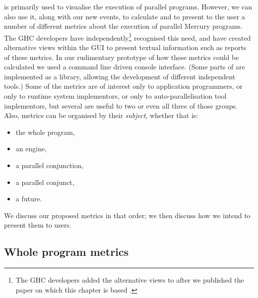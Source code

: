 \tscope is primarily used to visualise the execution of parallel programs.
However, we can also use it, along with our new events,
to calculate and to present to the user
a number of different metrics about the execution of parallel Mercury programs.
The GHC developers have independently\footnote{
    The GHC developers added the alternative views to \tscope after we
    published the paper on which this chapter is based
    \citep{pbone:2011:tscope}.}
recognised this need,
and have created alternative views within the \tscope GUI to present textual
information such as reports of these metrics.
In our rudimentary prototype of how these metrics could be calculated we
used a command line driven console interface.
(Some parts of \tscope are implemented as a library,
allowing the development of different independent tools.)
Some of the metrics are of interest
only to application programmers,
or only to runtime system implementors,
or only to auto-parallelisation tool implementors,
but several are useful to two or even all three of those groups.
Also, metrics can be organised by their \emph{subject},
whether that is:
\begin{itemize}
    \item the whole program,

    \item an engine,

    \item a parallel conjunction,

    \item a parallel conjunct,

    \item a future.
\end{itemize}
We discuss our proposed metrics in that order;
we then discuss how we intend to present them to users.

%

\subsection{Whole program metrics}


